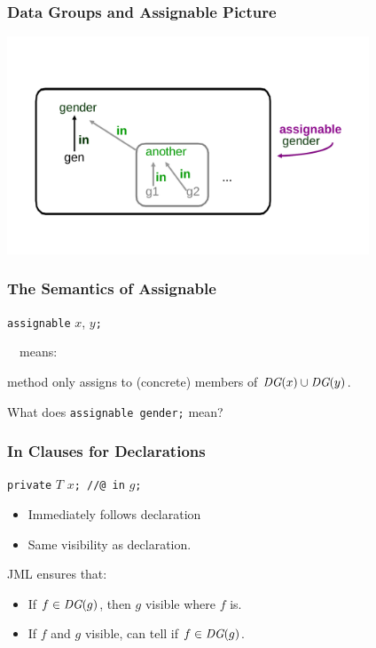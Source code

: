 \begin{frame}
\frametitle{Data Groups and Assignable Picture}
\includegraphics[width=4.25in]{datagroup}
\end{frame}

\begin{frame}[fragile]
\frametitle{The Semantics of Assignable}

\lstinline!assignable! $x$, $y$\texttt{;}

~~means:

method only assigns to (concrete) members of 
$\textit{DG}(x) \cup \textit{DG}(y)$.

\begin{question}
What does \lstinline!assignable gender;! mean?
\end{question}
\end{frame}

\begin{frame}[fragile]
\frametitle{In Clauses for Declarations}

\lstinline!private! $T$ $x$\lstinline!; //@ in! $g$\texttt{;}

\begin{itemize}
\item
Immediately follows declaration

\item
Same visibility as declaration.
\end{itemize}

JML ensures that:
\begin{itemize}
\item
If $f \in \textit{DG}(g)$, then $g$ visible where $f$ is.

\item
If $f$ and $g$ visible,
can tell if $f \in \textit{DG}(g)$.
\end{itemize}
\end{frame}

